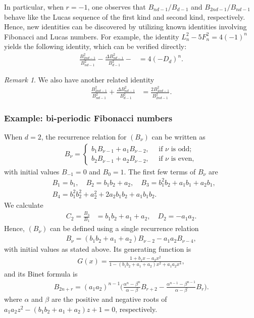 \documentclass[12pt]{article}
\theoremstyle{plain}
\theoremstyle{definition}
\theoremstyle{remark}
\newtheorem{remark}[theorem]{Remark}
\begin{document}
In particular, when $ r = -1 $, one observes that $ B_{nd - 1}/B_{d - 1} $ and $ B_{2nd - 1}/B_{nd - 1} $ behave like the Lucas sequence of the first kind and second kind, respectively. Hence, new identities can be discovered by utilizing known identities involving Fibonacci and Lucas numbers. For example, the identity $ L_n^2 - 5F_n^2 = 4(-1)^n $ yields the following identity, which can be verified directly: 
\begin{align*}
	\frac{B_{2nd - 1}^2}{B_{nd - 1}^2} - \frac{\Delta B_{nd - 1}^2}{B_{d - 1}^2} -  &= 4(-D_d)^n.
\end{align*}

\begin{remark} We also have another related identity
\begin{align*}
	\frac{B_{2nd - 1}^2}{B_{nd - 1}^2} + \frac{\Delta B_{nd - 1}^2}{B_{d - 1}^2} &= \frac{2B_{4nd - 1}^2}{B_{2nd - 1}^2}. 
\end{align*}
\end{remark}

\subsubsection{Example: bi-periodic Fibonacci numbers}

When $ d = 2 $, the recurrence relation for $ (B_\nu) $ can be written as 
\begin{align*}
	B_\nu = \begin{cases} b_1 B_{\nu - 1} + a_1 B_{\nu - 2}, \quad \text{ if } \nu \text{ is odd}; \\ b_2 B_{\nu - 1} + a_2 B_{\nu - 2}, \quad \text{ if } \nu \text{ is even}, \end{cases}
\end{align*}
with initial values $ B_{-1} = 0 $ and $ B_0 = 1 $. The first few terms of $ B_\nu $ are
\begin{align*}
	&B_1 = b_1, \quad B_2 = b_1 b_2 + a_2, \quad B_3 = b_1^2 b_2 + a_1 b_1 + a_2 b_1, \\
	&B_4 = b_1^2 b_2^2 + a_2^2 + 2a_2 b_1 b_2 + a_1 b_1 b_2. 
\end{align*}
We calculate
\begin{align*}
	C_2 = \frac{B_3}{B_1} &= b_1 b_2 + a_1 + a_2, \quad D_2 = -a_1 a_2.
\end{align*}
Hence, $ (B_\nu) $ can be defined using a single recurrence relation 
\begin{align*}
	B_\nu = (b_1 b_2 + a_1 + a_2) B_{\nu - 2} - a_1 a_2 B_{\nu - 4},
\end{align*}
with initial values as stated above. Its generating function is 
\begin{align*}
	G(x) = \frac{1 + b_1 x - a_2 x^2}{1 - (b_1 b_2 + a_1 + a_2) x^2 + a_1 a_2 x^4},
\end{align*}
and its Binet formula is 
\begin{align*}
	B_{2n + r} = (a_1 a_2)^{n - 1} \bigg( \frac{\alpha^n - \beta^n}{\alpha - \beta} B_{r + 2} - \frac{\alpha^{n - 1} - \beta^{n - 1}}{\alpha - \beta} B_r \bigg).
\end{align*}
where $ \alpha $ and $ \beta $ are the positive and negative roots of $ a_1 a_2 z^2 - (b_1 b_2 + a_1 + a_2)z + 1 = 0 $, respectively.
\end{document}

